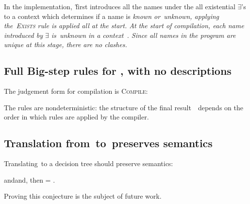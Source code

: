 \documentclass[manuscript,screen, 12pt, nonacm]{acmart}
\begin{document}
      In the implementation,~\DTran\~first introduces all the names under the
      all existential $\exists$'s to a context which determines if a name is
      \it{known} or~\it{unknown}, applying the~\textsc{Exists} rule is applied
      all at the start. At the start of compilation, each name introduced by
      $\exists$ is~\it{unknown} in a context~\ctx. Since all names in the
      program are unique at this stage, there are no clashes. 

      \subsection{Full Big-step rules for \Compile, with no descriptions}

        The judgement form for compilation is \textsc{Compile}: 


The rules are nondeterministic: the structure of the final result~\expr\ depends
on the order in which rules are applied by the compiler.  

\rawcompiler

    \subsection{Translation from~\VMinus to~\D preserves semantics}
    
    Translating~\iffibf to a decision tree should preserve semantics:
    \begin{conjecture}
      \vmeval[result={\result[1]}]\;and\;\compilebig[iffi=\expr,
      compiled=\expr']\;and\;\vmeval[exp=\expr', result={\result[2]}], then
      {\result[1]} = {\result[2]}. 
    \end{conjecture}
    Proving this conjecture is the subject of future work. 
\end{document}
